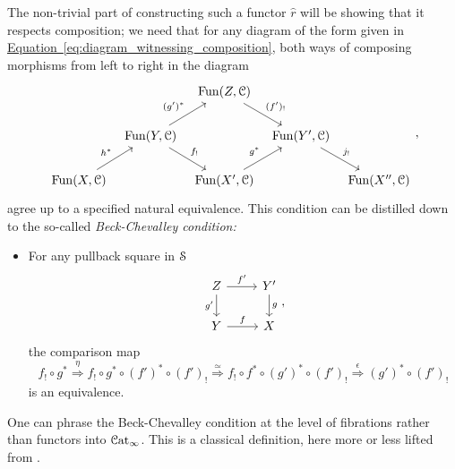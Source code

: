 \documentclass[main.tex]{subfiles}
\begin{document}
The non-trivial part of constructing such a functor $\hat{r}$ will be showing that it respects composition; we need that for any diagram of the form given in \hyperref[eq:diagram_witnessing_composition]{Equation~\ref*{eq:diagram_witnessing_composition}}, both ways of composing morphisms from left to right in the diagram
\begin{equation*}
  \begin{tikzcd}[column sep=tiny]
    && \Fun(Z, \category{C})
    \arrow[dr, "(f')_{!}"]
    \\
    & \Fun(Y, \category{C})
    \arrow[ur, "(g')^{*}"]
    \arrow[dr, "f_{!}"]
    && \Fun(Y', \category{C})
    \arrow[dr, "j_{!}"]
    \\
    \Fun(X, \category{C})
    \arrow[ur, "h^{*}"]
    && \Fun(X', \category{C})
    \arrow[ur, "g^{*}"]
    && \Fun(X'', \category{C})
  \end{tikzcd},
\end{equation*}
agree up to a specified natural equivalence. This condition can be distilled down to the so-called \emph{Beck-Chevalley condition:}
\begin{itemize}
  \item For any pullback square in $\S$
    \begin{equation*}
      \begin{tikzcd}
        Z
        \arrow[r, "f'"]
        \arrow[d, swap, "g'"]
        & Y'
        \arrow[d, "g"]
        \\
        Y
        \arrow[r, "f"]
        & X
      \end{tikzcd},
    \end{equation*}
    the comparison map
    \begin{equation*}
      f_{!} \circ g^{*} \overset{\eta}{\Rightarrow} f_{!} \circ g^{*} \circ (f')^{*} \circ (f')_{!} \overset{\simeq}{\Rightarrow} f_{!} \circ f^{*} \circ (g')^{*} \circ (f')_{!} \overset{\epsilon}{\Rightarrow} (g')^{*} \circ (f')_{!}
    \end{equation*}
    is an equivalence.
\end{itemize}

One can phrase the Beck-Chevalley condition at the level of fibrations rather than functors into $\ICat$. This is a classical definition, here more or less lifted from \cite{luriehopkins2013ambidexterity}.
\end{document}
